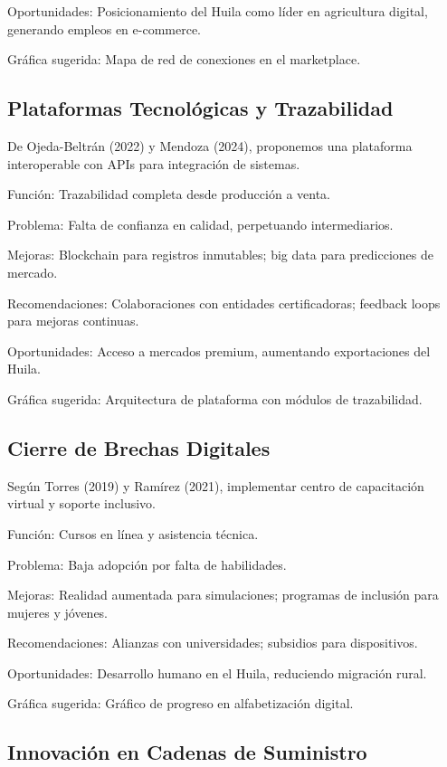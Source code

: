Oportunidades: Posicionamiento del Huila como líder en agricultura digital, generando empleos en e-commerce.

Gráfica sugerida: Mapa de red de conexiones en el marketplace.

\subsection{Plataformas Tecnológicas y Trazabilidad}

De Ojeda-Beltrán (2022) y Mendoza (2024), proponemos una plataforma interoperable con APIs para integración de sistemas.

Función: Trazabilidad completa desde producción a venta.

Problema: Falta de confianza en calidad, perpetuando intermediarios.

Mejoras: Blockchain para registros inmutables; big data para predicciones de mercado.

Recomendaciones: Colaboraciones con entidades certificadoras; feedback loops para mejoras continuas.

Oportunidades: Acceso a mercados premium, aumentando exportaciones del Huila.

Gráfica sugerida: Arquitectura de plataforma con módulos de trazabilidad.

\subsection{Cierre de Brechas Digitales}

Según Torres (2019) y Ramírez (2021), implementar centro de capacitación virtual y soporte inclusivo.

Función: Cursos en línea y asistencia técnica.

Problema: Baja adopción por falta de habilidades.

Mejoras: Realidad aumentada para simulaciones; programas de inclusión para mujeres y jóvenes.

Recomendaciones: Alianzas con universidades; subsidios para dispositivos.

Oportunidades: Desarrollo humano en el Huila, reduciendo migración rural.

Gráfica sugerida: Gráfico de progreso en alfabetización digital.

\subsection{Innovación en Cadenas de Suministro}

